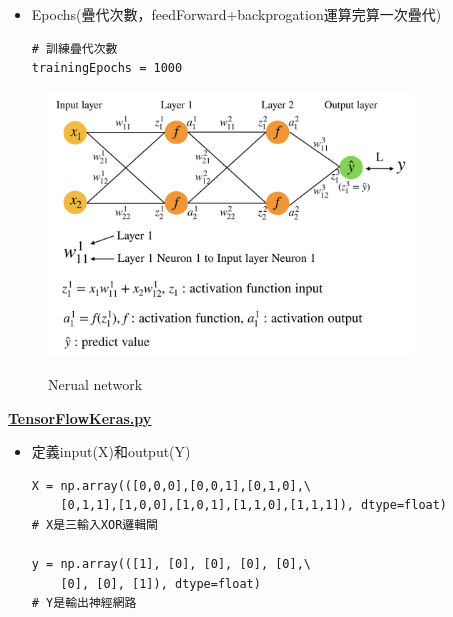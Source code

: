 \documentclass[12pt, a4paper]{article}
\begin{document}
\begin{itemize}
\item Epochs(疊代次數，feedForward+backprogation運算完算一次疊代)\\
\begin{lstlisting}
# 訓練疊代次數
trainingEpochs = 1000
\end{lstlisting}
\end{itemize}

\begin{figure}[hbt!]
\center
\includegraphics[height=7cm]{nn_network}
\label{fig:Nerual network}
\caption{Nerual network}
\end{figure}
\newpage
\textbf{\href{https://www.notion.so/codes-40723150-80bd6b7f30e4423f950a04f4447a70ab}{\underline{TensorFlowKeras.py}}}

\begin{itemize}
\item 定義input(X)和output(Y)\\
\begin{lstlisting}
X = np.array(([0,0,0],[0,0,1],[0,1,0],\
    [0,1,1],[1,0,0],[1,0,1],[1,1,0],[1,1,1]), dtype=float)
# X是三輸入XOR邏輯閘

y = np.array(([1], [0], [0], [0], [0],\
    [0], [0], [1]), dtype=float)
# Y是輸出神經網路
\end{lstlisting}
\end{itemize}
\end{document}
